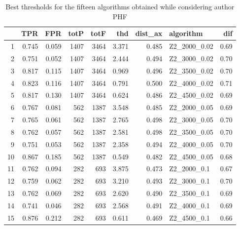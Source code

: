 \documentclass{article}\usepackage[]{graphicx}\usepackage[]{color}
\begin{document}
\begin{table}[ht]
\centering
\begin{tabular}{rrrrrrrlr}
  \hline
 & TPR & FPR & totP & totF & thd & dist\_ax & algorithm & dif \\ 
  \hline
1 & 0.745 & 0.059 & 1407 & 3464 & 3.371 & 0.485 & Z2\_2000\_0.02 & 0.69 \\ 
  2 & 0.751 & 0.052 & 1407 & 3464 & 2.444 & 0.494 & Z2\_3000\_0.02 & 0.70 \\ 
  3 & 0.817 & 0.115 & 1407 & 3464 & 0.969 & 0.496 & Z2\_3500\_0.02 & 0.70 \\ 
  4 & 0.823 & 0.116 & 1407 & 3464 & 0.791 & 0.500 & Z2\_4000\_0.02 & 0.71 \\ 
  5 & 0.817 & 0.130 & 1407 & 3464 & 0.624 & 0.486 & Z2\_4500\_0.02 & 0.69 \\ 
  6 & 0.767 & 0.081 & 562 & 1387 & 3.548 & 0.485 & Z2\_2000\_0.05 & 0.69 \\ 
  7 & 0.765 & 0.061 & 562 & 1387 & 2.765 & 0.498 & Z2\_3000\_0.05 & 0.70 \\ 
  8 & 0.762 & 0.057 & 562 & 1387 & 2.581 & 0.498 & Z2\_3500\_0.05 & 0.70 \\ 
  9 & 0.751 & 0.053 & 562 & 1387 & 2.358 & 0.494 & Z2\_4000\_0.05 & 0.70 \\ 
  10 & 0.867 & 0.185 & 562 & 1387 & 0.549 & 0.482 & Z2\_4500\_0.05 & 0.68 \\ 
  11 & 0.762 & 0.094 & 282 & 693 & 3.875 & 0.473 & Z2\_2000\_0.1 & 0.67 \\ 
  12 & 0.759 & 0.062 & 282 & 693 & 3.210 & 0.493 & Z2\_3000\_0.1 & 0.70 \\ 
  13 & 0.762 & 0.069 & 282 & 693 & 2.620 & 0.490 & Z2\_3500\_0.1 & 0.69 \\ 
  14 & 0.741 & 0.046 & 282 & 693 & 2.568 & 0.491 & Z2\_4000\_0.1 & 0.69 \\ 
  15 & 0.876 & 0.212 & 282 & 693 & 0.611 & 0.469 & Z2\_4500\_0.1 & 0.66 \\ 
   \hline
\end{tabular}
\caption{Best thresholds for the fifteen algorithms obtained while considering author PHF} 
\end{table}
\end{document}
